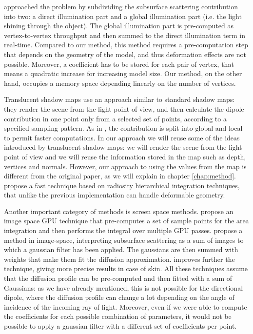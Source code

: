 \cite{Lensch:2002:IRT:826030.826632} approached the problem by subdividing the subsurface scattering contribution into two: a direct illumination part and a global illumination part (i.e. the light shining through the object). The global illumination part is pre-computed as vertex-to-vertex throughput and then summed to the direct illumination term in real-time. Compared to our method, this method requires a pre-computation step that depends on the geometry of the model, and thus deformation effects are not possible. Moreover, a coefficient has to be stored for each pair of vertex, that means a quadratic increase for increasing model size. Our method, on the other hand, occupies a memory space depending linearly on the number of vertices.

Translucent shadow maps \citep{Dachsbacher:2003:TSM:882404.882433} use an approach similar to standard shadow maps: they render the scene from the light point of view, and then calculate the dipole contribution in one point only from a selected set of points, according to a specified sampling pattern. As in \cite{Lensch:2002:IRT:826030.826632}, the contribution is split into global and local to permit faster computations. In our approach we will reuse some of the ideas introduced by translucent shadow maps: we will render the scene from the light point of view and we will reuse the information stored in the map such as depth, vertices and normals. However, our approach to using the values from the map is different from the original paper, as we will explain in chapter \ref{chap:method}. \cite{Mertens:2003:IRT:882404.882423} propose a fast technique based on radiosity hierarchical integration techniques, that unlike the previous implementation can handle deformable geometry.

Another important category of methods is screen space methods. \cite{1238246} propose an image space GPU technique that pre-computes a set of sample points for the area integration and then performs the integral over multiple GPU passes. \cite{d'Eon:2007:ERH:2383847.2383869,deonss} propose a method in image-space, interpreting subsurface scattering as a sum of images to which a gaussian filter has been applied. The gaussians are then summed with weights that make them fit the diffusion approximation. \cite{Jimenez:2009:SPR:1609967.1609970} improves further the technique, giving more precise results in case of skin. All these techniques assume that the diffusion profile can be pre-computed and then fitted with a sum of Gaussians: as we have already mentioned, this is not possible for the directional dipole, where the diffusion profile can change a lot depending on the angle of incidence of the incoming ray of light. Moreover, even if we were able to compute the coefficients for each possible combination of parameters, it would not be possible to apply a gaussian filter with a different set of coefficients per point.

